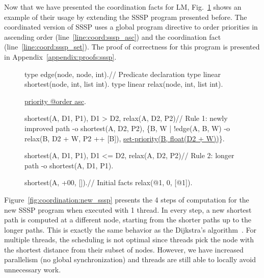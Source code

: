 Now that we have presented the coordination facts for LM,
Fig.~\ref{code:shortest_path_program_coord} shows an example of their usage by
extending the SSSP program presented before. The coordinated version of SSSP
uses a global program directive to order priorities in ascending order
(line~\ref{line:coord:sssp_asc}) and the coordination fact 
(line~\ref{line:coord:sssp_set}). The proof of correctness for this program is
presented in Appendix~\ref{appendix:proofs:sssp}.

\begin{figure}[ht]
\begin{LineCode}[commandchars=\\\{\}]
type edge(node, node, int).\hfill// Predicate declaration
type linear shortest(node, int, list int).
type linear relax(node, int, list int).

\underline{priority @order asc}.\label{line:coord:sssp_asc}

shortest(A, D1, P1), D1 > D2, relax(A, D2, P2)\hfill// Rule 1: newly improved path\label{line:coord:ssspfirst1}
   -o shortest(A, D2, P2),
      \{B, W | !edge(A, B, W) -o
         relax(B, D2 + W, P2 ++ [B]),
         \underline{set-priority(B, float(D2 + W))}\}.\label{line:coord:sssp_set}\label{line:coord:ssspfirst2}

shortest(A, D1, P1), D1 <= D2, relax(A, D2, P2)\hfill// Rule 2: longer path\label{line:coord:ssspsecond1}
   -o shortest(A, D1, P1).\label{line:coord:ssspsecond2}

shortest(A, +00, []).\hfill// Initial facts
relax(@1, 0, [@1]).
\end{LineCode}
   \label{code:shortest_path_program_coord}
\end{figure}

Figure~\ref{fig:coordination:new_sssp} presents the 4 steps of computation for
the new SSSP program when executed with 1 thread. In every step, a new shortest
path is computed at a different node, starting from the shorter paths up to the
longer paths. This is exactly the same behavior as the Dijkstra's
algorithm~\cite{Dijkstra}.  For multiple threads, the scheduling is not
optimal since threads pick the node with the shortest distance from their subset
of nodes. However, we have increased parallelism (no global synchronization)
and threads are still able to locally avoid unnecessary work.

